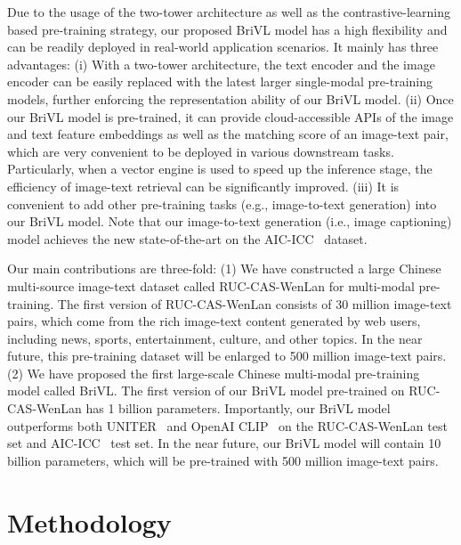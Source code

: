 \documentclass[10pt,twocolumn,letterpaper]{article}
\begin{document}
Due to the usage of the two-tower architecture as well as the contrastive-learning based pre-training strategy, our proposed BriVL model has a high flexibility and can be readily deployed in real-world application scenarios. It mainly has three advantages:
(i) With a two-tower architecture, the text encoder and the image encoder can be easily replaced with the latest larger single-modal pre-training models, further enforcing the representation ability of our BriVL model. 
(ii) Once our BriVL model is pre-trained, it can provide cloud-accessible APIs of the image and text feature embeddings as well as the matching score of an image-text pair, which are very convenient to be deployed in various downstream tasks. Particularly, when a vector engine is used to speed up the inference stage, the efficiency of image-text retrieval can be significantly improved.
(iii) It is convenient to add other pre-training tasks (e.g., image-to-text generation) into our BriVL model. Note that our image-to-text generation (i.e., image captioning) model achieves the new state-of-the-art on the AIC-ICC~\cite{wu2017ai}  dataset. 

Our main contributions are three-fold: (1) We have constructed a large Chinese multi-source image-text dataset called RUC-CAS-WenLan for multi-modal pre-training. The first version of RUC-CAS-WenLan consists of 30 million image-text pairs, which come from the rich image-text content generated by web users, including news, sports, entertainment, culture, and other topics. In the near future, this pre-training dataset will be enlarged to 500 million image-text pairs. (2) We have proposed the first large-scale Chinese multi-modal pre-training model called BriVL. The first version of our BriVL model pre-trained on RUC-CAS-WenLan has 1 billion parameters. Importantly, our BriVL model outperforms both UNITER~\cite{chen2020uniter} and OpenAI CLIP~\cite{radford2021learning} on the RUC-CAS-WenLan test set and AIC-ICC~\cite{wu2017ai} test set. In the near future, our BriVL model will contain 10 billion parameters, which will be pre-trained with 500 million image-text pairs.

\vspace{-0.2cm}
\section{Methodology}
\label{sec:cmp}
\end{document}
